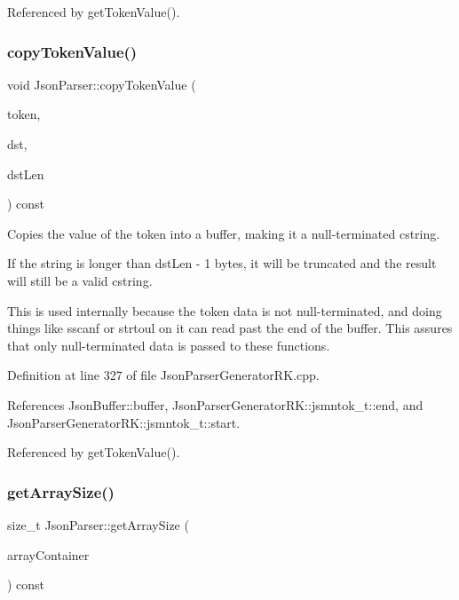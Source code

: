 Referenced by get\+Token\+Value().

\mbox{\label{class_json_parser_ab7f8a2873dd3a2935cf0a22133a5378f}} 
\subsubsection{\texorpdfstring{copy\+Token\+Value()}{copyTokenValue()}}
{\footnotesize\ttfamily void Json\+Parser\+::copy\+Token\+Value (\begin{DoxyParamCaption}\item[{const \hyperlink{struct_json_parser_generator_r_k_1_1jsmntok__t}{Json\+Parser\+Generator\+R\+K\+::jsmntok\+\_\+t} $\ast$}]{token,  }\item[{char $\ast$}]{dst,  }\item[{size\+\_\+t}]{dst\+Len }\end{DoxyParamCaption}) const}



Copies the value of the token into a buffer, making it a null-\/terminated cstring. 

If the string is longer than dst\+Len -\/ 1 bytes, it will be truncated and the result will still be a valid cstring.

This is used internally because the token data is not null-\/terminated, and doing things like sscanf or strtoul on it can read past the end of the buffer. This assures that only null-\/terminated data is passed to these functions. 

Definition at line 327 of file Json\+Parser\+Generator\+R\+K.\+cpp.



References Json\+Buffer\+::buffer, Json\+Parser\+Generator\+R\+K\+::jsmntok\+\_\+t\+::end, and Json\+Parser\+Generator\+R\+K\+::jsmntok\+\_\+t\+::start.



Referenced by get\+Token\+Value().

\mbox{\label{class_json_parser_aeb46af21c13fa2396e065543bd8db265}} 
\subsubsection{\texorpdfstring{get\+Array\+Size()}{getArraySize()}}
{\footnotesize\ttfamily size\+\_\+t Json\+Parser\+::get\+Array\+Size (\begin{DoxyParamCaption}\item[{const \hyperlink{struct_json_parser_generator_r_k_1_1jsmntok__t}{Json\+Parser\+Generator\+R\+K\+::jsmntok\+\_\+t} $\ast$}]{array\+Container }\end{DoxyParamCaption}) const}



